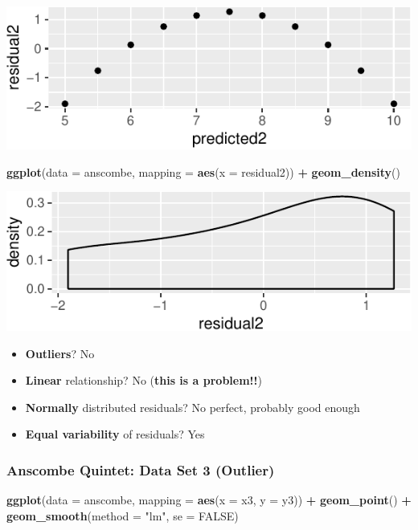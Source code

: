 \documentclass[14pt]{extarticle}
\newenvironment{Shaded}{\begin{snugshade}}{\end{snugshade}}
\newcommand{\KeywordTok}[1]{\textcolor[rgb]{0.13,0.29,0.53}{\textbf{#1}}}
\newcommand{\DataTypeTok}[1]{\textcolor[rgb]{0.13,0.29,0.53}{#1}}
\newcommand{\StringTok}[1]{\textcolor[rgb]{0.31,0.60,0.02}{#1}}
\newcommand{\OtherTok}[1]{\textcolor[rgb]{0.56,0.35,0.01}{#1}}
\newcommand{\OperatorTok}[1]{\textcolor[rgb]{0.81,0.36,0.00}{\textbf{#1}}}
\newcommand{\NormalTok}[1]{#1}
\begin{document}
\includegraphics{20181112_anscombe_residuals_files/figure-latex/unnamed-chunk-7-1.pdf}

\begin{Shaded}
\begin{Highlighting}[]
\KeywordTok{ggplot}\NormalTok{(}\DataTypeTok{data =}\NormalTok{ anscombe, }\DataTypeTok{mapping =} \KeywordTok{aes}\NormalTok{(}\DataTypeTok{x =}\NormalTok{ residual2)) }\OperatorTok{+}
\StringTok{  }\KeywordTok{geom_density}\NormalTok{()}
\end{Highlighting}
\end{Shaded}

\includegraphics{20181112_anscombe_residuals_files/figure-latex/unnamed-chunk-8-1.pdf}

\begin{itemize}
\item
  \textbf{Outliers}? No
\item
  \textbf{Linear} relationship? No (\textbf{this is a problem!!})
\item
  \textbf{Normally} distributed residuals? No perfect, probably good
  enough
\item
  \textbf{Equal variability} of residuals? Yes
\end{itemize}

\subsubsection{Anscombe Quintet: Data Set 3
(Outlier)}\label{anscombe-quintet-data-set-3-outlier}

\begin{Shaded}
\begin{Highlighting}[]
\KeywordTok{ggplot}\NormalTok{(}\DataTypeTok{data =}\NormalTok{ anscombe, }\DataTypeTok{mapping =} \KeywordTok{aes}\NormalTok{(}\DataTypeTok{x =}\NormalTok{ x3, }\DataTypeTok{y =}\NormalTok{ y3)) }\OperatorTok{+}
\StringTok{  }\KeywordTok{geom_point}\NormalTok{() }\OperatorTok{+}
\StringTok{  }\KeywordTok{geom_smooth}\NormalTok{(}\DataTypeTok{method =} \StringTok{"lm"}\NormalTok{, }\DataTypeTok{se =} \OtherTok{FALSE}\NormalTok{)}
\end{Highlighting}
\end{Shaded}
\end{document}

